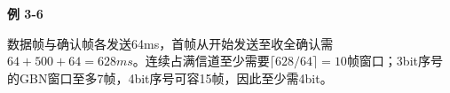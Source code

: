 {\color{ink}\bfseries 例 3-6}\par\vspace{1bp}数据帧与确认帧各发送64ms，首帧从开始发送至收全确认需\(64+\allowbreak{}500+\allowbreak{}64=\allowbreak{}628ms\)。连续占满信道至少需要\(\lceil 628/\allowbreak{}64\rceil =\allowbreak{}10\)帧窗口；3bit序号的GBN窗口至多7帧，4bit序号可容15帧，因此至少需4bit。
